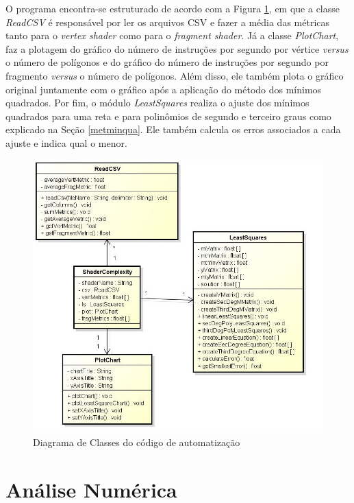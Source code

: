 	O programa encontra-se estruturado de acordo com a Figura \ref{minquad_diag}, em que a classe \textit{ReadCSV} é responsável por ler os arquivos CSV e fazer a média das métricas tanto para o \textit{vertex shader} como para o \textit{fragment shader}. Já a classe \textit{PlotChart}, faz a plotagem do gráfico do número de instruções por segundo por vértice \textit{versus} o número de polígonos e do gráfico do número de instruções por segundo por fragmento \textit{versus} o número de polígonos. Além disso, ele também plota o gráfico original juntamente com o gráfico após a aplicação do método dos mínimos quadrados. Por fim, o módulo \textit{LeastSquares} realiza o ajuste dos mínimos quadrados para uma reta e para polinômios de segundo e terceiro graus como explicado na Seção \ref{metminqua}. Ele também calcula os erros associados a cada ajuste e indica qual o menor. 

	\begin{figure}[h]
	\centering
		\includegraphics[keepaspectratio=true,scale=0.6]{figuras/minquad_diag.jpg}
	\caption{Diagrama de Classes do código de automatização}
	\label{minquad_diag}
	\end{figure}


\section{Análise Numérica}


